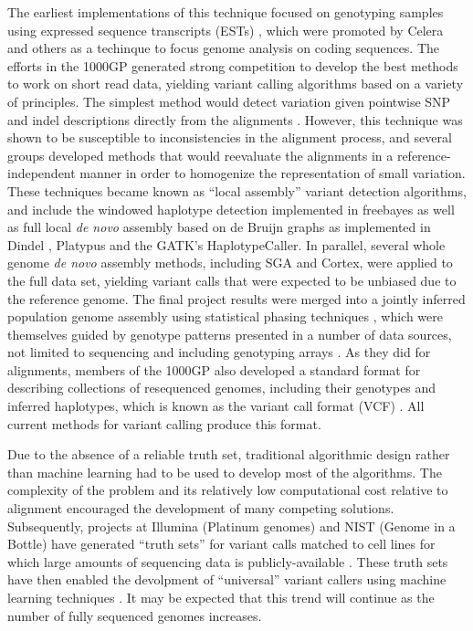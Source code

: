 The earliest implementations of this technique focused on genotyping samples using expressed sequence transcripts (ESTs) \cite{marth1999general}, which were promoted by Celera and others as a techinque to focus genome analysis on coding sequences.
The efforts in the 1000GP generated strong competition to develop the best methods to work on short read data, yielding variant calling algorithms based on a variety of principles.
The simplest method would detect variation given pointwise SNP and indel descriptions directly from the alignments \cite{li2009sequence,gatk2011}.
However, this technique was shown to be susceptible to inconsistencies in the alignment process, and several groups developed methods that would reevaluate the alignments in a reference-independent manner in order to homogenize the representation of small variation.
These techniques became known as ``local assembly'' variant detection algorithms, and include the windowed haplotype detection implemented in freebayes \cite{garrison2012haplotype} as well as full local \emph{de novo} assembly based on de Bruijn graphs as implemented in Dindel \cite{albers2010dindel}, Platypus \cite{rimmer2014integrating} and the GATK's HaplotypeCaller.
In parallel, several whole genome \emph{de novo} assembly methods, including SGA and Cortex, were applied to the full data set, yielding variant calls that were expected to be unbiased due to the reference genome.
The final project results were merged into a jointly inferred population genome assembly using statistical phasing techniques \cite{browning2007,howie2011,delaneau2012}, which were themselves guided by genotype patterns presented in a number of data sources, not limited to sequencing and including genotyping arrays \cite{1000g2015}.
As they did for alignments, members of the 1000GP also developed a standard format for describing collections of resequenced genomes, including their genotypes and inferred haplotypes, which is known as the variant call format (VCF) \cite{danecek2011variant}.
All current methods for variant calling produce this format.

Due to the absence of a reliable truth set, traditional algorithmic design rather than machine learning had to be used to develop most of the algorithms.
The complexity of the problem and its relatively low computational cost relative to alignment encouraged the development of many competing solutions.
Subsequently, projects at Illumina (Platinum genomes) and NIST (Genome in a Bottle) have generated ``truth sets'' for variant calls matched to cell lines for which large amounts of sequencing data is publicly-available \cite{eberle2013platinum,zook2014integrating}.
These truth sets have then enabled the devolpment of ``universal'' variant callers using machine learning techniques \cite{poplin2017creating}.
It may be expected that this trend will continue as the number of fully sequenced genomes increases.

